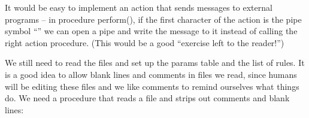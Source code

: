 
It would be easy to implement an action that sends messages to external
programs -- in procedure \textsf{perform()}, if the first character of
the action is the pipe symbol
{\textquotedblleft}{\textbar}{\textquotedblright} we can open a pipe
and write the message to it instead of calling the right action
procedure. (This would be a good {\textquotedblleft}exercise left to
the reader!{\textquotedblright})

We still need to read the files and set up the \textsf{params} table and
the list of rules. It is a good idea to allow blank lines and comments
in files we read, since humans will be editing these files and we like
comments to remind ourselves what things do. We need a procedure that
reads a file and strips out comments and blank lines:

